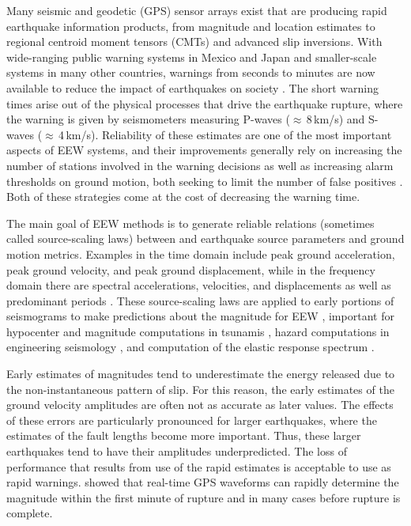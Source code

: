 \documentclass[preprint, aps, showpacs]{revtex4-1}
\begin{document}
Many seismic and geodetic (GPS) sensor arrays exist that are producing rapid earthquake information products, from magnitude and location estimates to regional centroid moment tensors (CMTs) and advanced slip inversions.
With wide-ranging public warning systems in Mexico and Japan and smaller-scale systems in many other countries, warnings from seconds to minutes are now available to reduce the impact of earthquakes on society \cite{StAl2016}.
The short warning times arise out of the physical processes that drive the earthquake rupture, where the warning is given by seismometers measuring P-waves ($\approx$\,8\,km/s) and S-waves ($\approx$\,4\,km/s).
Reliability of these estimates are one of the most important aspects of EEW systems, and their improvements generally rely on increasing the number of stations involved in the warning decisions as well as increasing alarm thresholds on ground motion, both seeking to limit the number of false positives \cite{KuCo2015}. Both of these strategies come at the cost of decreasing the warning time.

The main goal of EEW methods is to generate reliable relations (sometimes called source-scaling laws) between and earthquake source parameters and ground motion metrics. Examples in the time domain include peak ground acceleration, peak ground velocity, and peak
ground displacement, while in the frequency domain there are spectral accelerations, velocities, and displacements as well as predominant periods \cite{Do2003}. These source-scaling laws are applied to early portions of seismograms to make predictions about the magnitude for EEW \cite{AlGa2009}, important for hypocenter and magnitude computations in tsunamis \cite{MeCr2015}, hazard computations in engineering seismology \cite{PaMu2012}, and computation of the elastic response spectrum \cite{Ch2007}.

Early estimates of magnitudes tend to underestimate the energy released due to the non-instantaneous pattern of slip.
For this reason, the early estimates of the ground velocity amplitudes are often not as accurate as later values. 
The effects of these errors are particularly pronounced for larger earthquakes, where the estimates of the fault lengths become more important.
Thus, these larger earthquakes tend to have their amplitudes underpredicted.
The loss of performance that results from use of the rapid estimates is acceptable to use as rapid warnings.
\cite{MeCr2015} showed that real-time GPS waveforms can rapidly determine the magnitude within the first minute of rupture and in many cases before rupture is complete.
\end{document}
